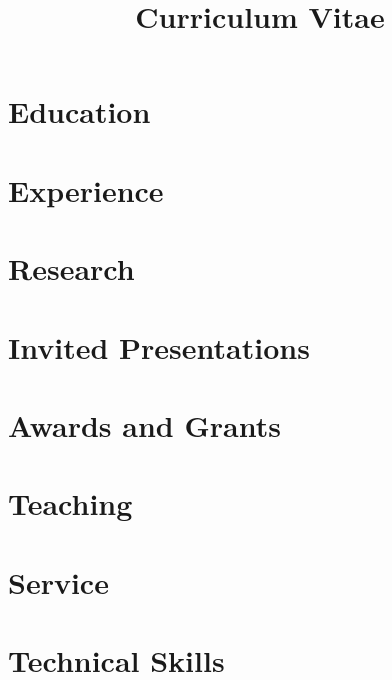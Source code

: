 \documentclass[roman]{moderncv}
\title{Curriculum Vitae}
\begin{document}
\maketitle
\vspace{-8mm}

\section*{Education}


\vspace{3mm}
\section{Experience}


\vspace{3mm}
\section{Research}


\vspace{3mm}
\section{Invited Presentations}


\vspace{3mm}
\section{Awards and Grants}


\vspace{3mm}
\section{Teaching}


\vspace{3mm}
\section{Service}


\vspace{3mm}
\section{Technical Skills}


\vspace{3mm}
\end{document}
